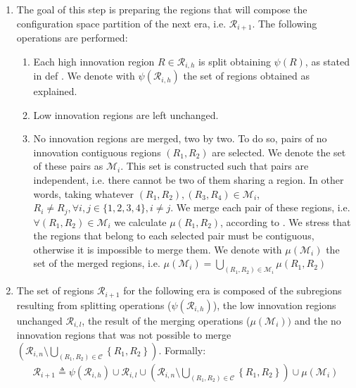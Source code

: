 \begin{enumerate}
\item The goal of this step is preparing the regions that will compose the configuration space partition of the next era, i.e. $\mathscr{R}_{i+1}$. The following operations are performed:
	\begin{enumerate}
		\item Each high innovation region $R\in\mathscr{R}_{i,h}$ is split obtaining $\psi(R)$, as stated in def . We denote with $\psi\left(\mathscr{R}_{i,h}\right)$ the set of regions obtained as explained.
		\item Low innovation regions are left unchanged.
		\item No innovation regions are merged, two by two. To do so, pairs of no innovation contiguous regions $(R_1,R_2)$ are selected. We denote the set of these pairs as $\mathscr{M}_i$. This set is constructed such that pairs are independent, i.e. there cannot be two of them sharing a region. In other words, taking whatever $(R_1,R_2),(R_3,R_4) \in \mathscr{M}_i$, $R_i \neq R_j, \forall i,j\in\lbrace1,2,3,4\rbrace, i\neq j$. 
We merge each pair of these regions, i.e. $\forall (R_1,R_2)\in\mathscr{M}_i$ we calculate $\mu(R_1,R_2)$, according to .
We stress that the regions that belong to each selected pair must be contiguous, otherwise it is impossible to merge them. We denote with $\mu(\mathscr{M}_i)$ the set of the merged regions, i.e. $\mu(\mathscr{M}_i) = \bigcup_{(R_1,R_2)\in\mathscr{M}_i} \mu(R_1,R_2)$
	\end{enumerate}


\item The set of regions $\mathcal{R}_{i+1}$ for the following era is composed of the subregions resulting from splitting operations ($\psi\left(\mathscr{R}_{i,h}\right)$), the low innovation regions unchanged $\mathcal{R}_{i,l}$, the result of the merging operations ($\mu(\mathscr{M}_i))$ and the no innovation regions that was not possible to merge $\left(\mathcal{R}_{i,n}\setminus\bigcup_{\left(R_{1},R_{2}\right)\in\mathcal{C}}\left\{ R_{1},R_{2}\right\} \right)$. Formally:
	\begin{align} 
	\mathcal{R}_{i+1} \triangleq
	\psi\left(\mathscr{R}_{i,h}\right) \cup \mathcal{R}_{i,l}\cup
	\left(\mathcal{R}_{i,n}\setminus\bigcup_{\left(R_{1},R_{2}\right)\in\mathcal{C}}\left\{ R_{1},R_{2}\right\} \right)\cup \mu(\mathscr{M}_i)
	\end{align}
\end{enumerate}



